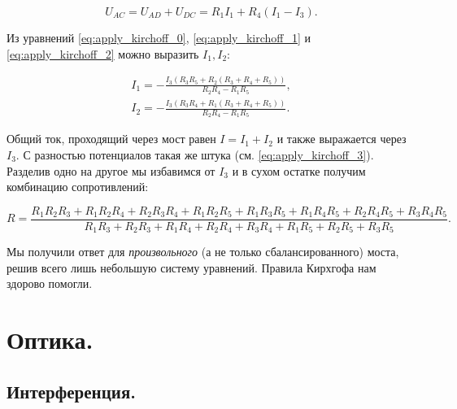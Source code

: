 \documentclass[11pt,a4paper]{article}
\numberwithin{equation}{section}
\newcommand{\nn}{\nonumber}
\begin{document}
\begin{equation}
  \label{eq:apply_kirchoff_3}
  U_{AC} = U_{AD} + U_{DC} = R_1 I_1 + R_4 (I_1 -I_3).
\end{equation}

Из уравнений \eqref{eq:apply_kirchoff_0}, \eqref{eq:apply_kirchoff_1}
и \eqref{eq:apply_kirchoff_2} можно выразить $I_1, I_2$:

\begin{eqnarray}
  \label{eq:apply_kirchoff_currents}
  \nn
  I_1 = -\frac{I_3 (R_3 R_5 + R_2 (R_3 + R_4 + R_5))}{R_2 R_4 -R_1
    R_5},\\
  I_2 = -\frac{I_3 (R_3 R_4 + R_1 (R_3 + R_4 + R_5))}{R_2 R_4 -R_1
    R_5}.
\end{eqnarray}

Общий ток, проходящий через мост равен $I=I_1 + I_2$ и также
выражается через $I_3$. С разностью потенциалов такая же штука
(см. \eqref{eq:apply_kirchoff_3}). Разделив одно на другое мы
избавимся от $I_3$ и в сухом остатке получим комбинацию сопротивлений:

\begin{equation}
  \label{eq:bridge_answer}
  R = \frac{R_1 R_2 R_3 + R_1 R_2 R_4 + R_2 R_3 R_4 + R_1 R_2 R_5 +
    R_1 R_3 R_5 + R_1 R_4 R_5 + R_2 R_4 R_5 + R_3 R_4 R_5}{R_1 R_3 + R_2 R_3 + R_1 R_4 + R_2 R_4 + R_3 R_4 + R_1
    R_5 + R_2 R_5 + R_3 R_5}.
\end{equation}

Мы получили ответ для \textit{произвольного} (а не только
сбалансированного) моста, решив всего лишь небольшую систему
уравнений. Правила Кирхгофа нам здорово помогли. 

\section{Оптика.}
\label{sec:optics}

\subsection{Интерференция.}
\label{sec:interference}
\end{document}

